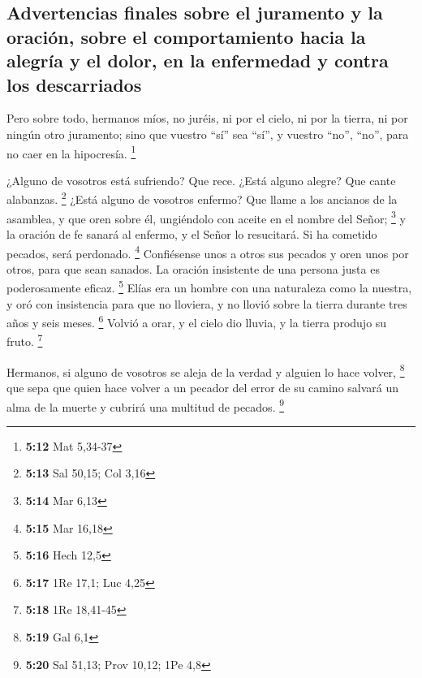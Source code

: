\hypertarget{advertencias-finales-sobre-el-juramento-y-la-oraciuxf3n-sobre-el-comportamiento-hacia-la-alegruxeda-y-el-dolor-en-la-enfermedad-y-contra-los-descarriados}{%
\subsection{Advertencias finales sobre el juramento y la oración, sobre
el comportamiento hacia la alegría y el dolor, en la enfermedad y contra
los
descarriados}\label{advertencias-finales-sobre-el-juramento-y-la-oraciuxf3n-sobre-el-comportamiento-hacia-la-alegruxeda-y-el-dolor-en-la-enfermedad-y-contra-los-descarriados}}

 Pero sobre todo, hermanos míos, no juréis, ni por el
cielo, ni por la tierra, ni por ningún otro juramento; sino que vuestro
``sí'' sea ``sí'', y vuestro ``no'', ``no'', para no caer en la
hipocresía. \footnote{\textbf{5:12} Mat 5,34-37}

 ¿Alguno de vosotros está sufriendo? Que rece. ¿Está
alguno alegre? Que cante alabanzas. \footnote{\textbf{5:13} Sal 50,15;
  Col 3,16}  ¿Está alguno de vosotros enfermo? Que llame
a los ancianos de la asamblea, y que oren sobre él, ungiéndolo con
aceite en el nombre del Señor; \footnote{\textbf{5:14} Mar 6,13}
 y la oración de fe sanará al enfermo, y el Señor lo
resucitará. Si ha cometido pecados, será perdonado. \footnote{\textbf{5:15}
  Mar 16,18}  Confiésense unos a otros sus pecados y oren
unos por otros, para que sean sanados. La oración insistente de una
persona justa es poderosamente eficaz. \footnote{\textbf{5:16} Hech 12,5}
 Elías era un hombre con una naturaleza como la nuestra,
y oró con insistencia para que no lloviera, y no llovió sobre la tierra
durante tres años y seis meses. \footnote{\textbf{5:17} 1Re 17,1; Luc
  4,25}  Volvió a orar, y el cielo dio lluvia, y la
tierra produjo su fruto. \footnote{\textbf{5:18} 1Re 18,41-45}

 Hermanos, si alguno de vosotros se aleja de la verdad y
alguien lo hace volver, \footnote{\textbf{5:19} Gal 6,1} 
que sepa que quien hace volver a un pecador del error de su camino
salvará un alma de la muerte y cubrirá una multitud de pecados.
\footnote{\textbf{5:20} Sal 51,13; Prov 10,12; 1Pe 4,8}
